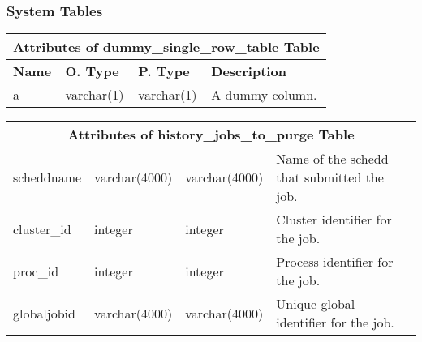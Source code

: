 \subsubsection{System Tables}
\begin{center}
  \begin{tabular}{|l|l|l|p{4in}|}\hline
    \multicolumn{4}{|c|}{\textbf{Attributes of dummy\_single\_row\_table Table}}\\ \hline
    \textbf{Name} & \textbf{O. Type} & \textbf{P. Type} & \textbf{Description}\\ \hline
    a & varchar(1) & varchar(1) & A dummy column. \\ \hline
  \end{tabular}
\vspace{24pt}

  \begin{tabular}{|l|l|l|p{3.2in}|}\hline
    \multicolumn{4}{|c|}{\textbf{Attributes of history\_jobs\_to\_purge Table}}\\ \hline
    scheddname & varchar(4000) & varchar(4000) & Name of the schedd that submitted the job. \\ \hline
    cluster\_id & integer & integer & Cluster identifier for the job. \\ \hline
    proc\_id & integer & integer & Process identifier for the job. \\ \hline
    globaljobid & varchar(4000) & varchar(4000) & Unique global identifier for the job. \\ \hline
  \end{tabular}
\vspace{24pt}


\end{center}
